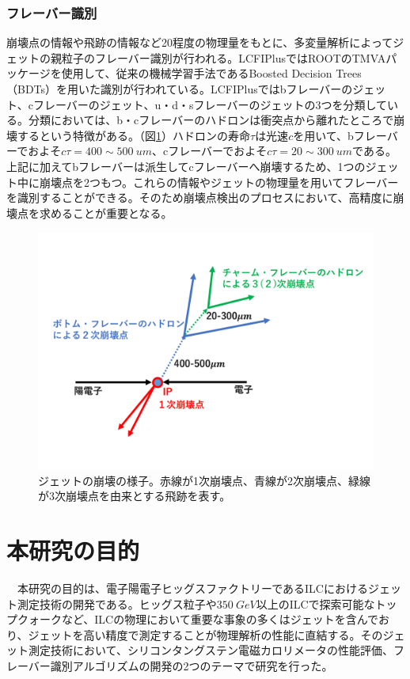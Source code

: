 \subsubsection{フレーバー識別}
崩壊点の情報や飛跡の情報など20程度の物理量をもとに、多変量解析によってジェットの親粒子のフレーバー識別が行われる。LCFIPlusではROOT\cite{root}のTMVA\cite{tmva}パッケージを使用して、従来の機械学習手法であるBoosted Decision Trees（BDTs）を用いた識別が行われている。LCFIPlusではbフレーバーのジェット、cフレーバーのジェット、u・d・sフレーバーのジェットの3つを分類している。分類においては、b・cフレーバーのハドロンは衝突点から離れたところで崩壊するという特徴がある。（図\ref{bcjets}）ハドロンの寿命$\tau$は光速$c$を用いて、bフレーバーでおよそ$c\tau = 400 \sim \SI{500}{um}$、cフレーバーでおよそ$c\tau = 20 \sim \SI{300}{um}$である。上記に加えてbフレーバーは派生してcフレーバーへ崩壊するため、1つのジェット中に崩壊点を2つもつ。これらの情報やジェットの物理量を用いてフレーバーを識別することができる。そのため崩壊点検出のプロセスにおいて、高精度に崩壊点を求めることが重要となる。
\begin{figure}[H]
	\begin{center}
 \includegraphics[keepaspectratio, scale=0.4]
 	{Figure/Introduction/bcjets.pdf}
 		\caption {ジェットの崩壊の様子。赤線が1次崩壊点、青線が2次崩壊点、緑線が3次崩壊点を由来とする飛跡を表す。}
 		\label{bcjets}
	\end{center}
\end{figure}
\section{本研究の目的}
　本研究の目的は、電子陽電子ヒッグスファクトリーであるILCにおけるジェット測定技術の開発である。ヒッグス粒子や$\SI{350}{GeV}$以上のILCで探索可能なトップクォークなど、ILCの物理において重要な事象の多くはジェットを含んでおり、ジェットを高い精度で測定することが物理解析の性能に直結する。そのジェット測定技術において、シリコンタングステン電磁カロリメータの性能評価、フレーバー識別アルゴリズムの開発の2つのテーマで研究を行った。\\
